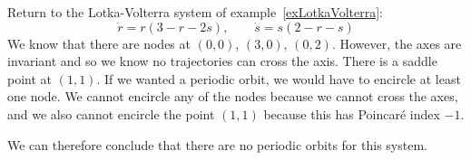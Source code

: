 \documentclass[../Main.tex]{subfiles}
\begin{document}
\begin{example}
    Return to the Lotka-Volterra system of example~\ref{exLotkaVolterra}:
    \begin{equation*}
        \dot{r} = r(3-r-2s),\qquad \dot{s} = s(2 - r - s)
    \end{equation*}
    We know that there are nodes at $(0, 0)$, $(3, 0)$, $(0, 2)$. However, the axes are invariant and so we know no trajectories can cross the axis. There is a saddle point at $(1, 1)$. If we wanted a periodic orbit, we would have to encircle at least one node. We cannot encircle any of the nodes because we cannot cross the axes, and we also cannot encircle the point $(1, 1)$ because this has Poincaré index $-1$.

    We can therefore conclude that there are no periodic orbits for this system.
\end{example}
\end{document}
